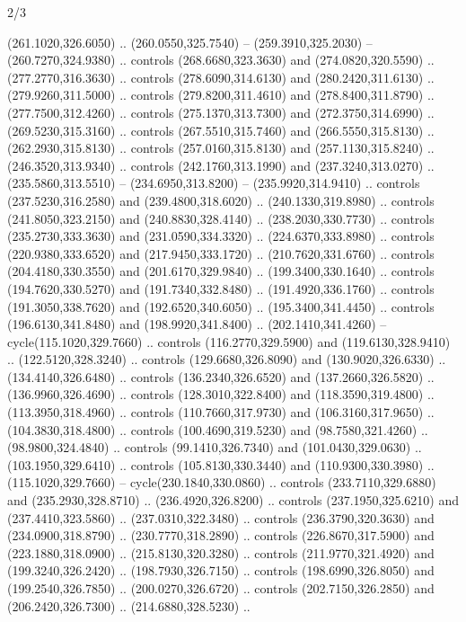 \begin{flagdescription}{2/3}
\begin{scope}[xshift=0.5\flaglength,yshift=0.5\flagwidth,scale=\stretchfactor]
\begin{scope}[scale=0.001645\flagwidth,yshift=65mm,xshift=-63mm]
\begin{scope}[y=0.80pt, x=0.80pt, yscale=-1,]
\begin{scope}[cm={{1.33333,0.0,0.0,1.33333,(0.0,1e-05)}}]
  (261.1020,326.6050) .. (260.0550,325.7540) -- (259.3910,325.2030) --
  (260.7270,324.9380) .. controls (268.6680,323.3630) and (274.0820,320.5590) ..
  (277.2770,316.3630) .. controls (278.6090,314.6130) and (280.2420,311.6130) ..
  (279.9260,311.5000) .. controls (279.8200,311.4610) and (278.8400,311.8790) ..
  (277.7500,312.4260) .. controls (275.1370,313.7300) and (272.3750,314.6990) ..
  (269.5230,315.3160) .. controls (267.5510,315.7460) and (266.5550,315.8130) ..
  (262.2930,315.8130) .. controls (257.0160,315.8130) and (257.1130,315.8240) ..
  (246.3520,313.9340) .. controls (242.1760,313.1990) and (237.3240,313.0270) ..
  (235.5860,313.5510) -- (234.6950,313.8200) -- (235.9920,314.9410) .. controls
  (237.5230,316.2580) and (239.4800,318.6020) .. (240.1330,319.8980) .. controls
  (241.8050,323.2150) and (240.8830,328.4140) .. (238.2030,330.7730) .. controls
  (235.2730,333.3630) and (231.0590,334.3320) .. (224.6370,333.8980) .. controls
  (220.9380,333.6520) and (217.9450,333.1720) .. (210.7620,331.6760) .. controls
  (204.4180,330.3550) and (201.6170,329.9840) .. (199.3400,330.1640) .. controls
  (194.7620,330.5270) and (191.7340,332.8480) .. (191.4920,336.1760) .. controls
  (191.3050,338.7620) and (192.6520,340.6050) .. (195.3400,341.4450) .. controls
  (196.6130,341.8480) and (198.9920,341.8400) .. (202.1410,341.4260) --
  cycle(115.1020,329.7660) .. controls (116.2770,329.5900) and
  (119.6130,328.9410) .. (122.5120,328.3240) .. controls (129.6680,326.8090) and
  (130.9020,326.6330) .. (134.4140,326.6480) .. controls (136.2340,326.6520) and
  (137.2660,326.5820) .. (136.9960,326.4690) .. controls (128.3010,322.8400) and
  (118.3590,319.4800) .. (113.3950,318.4960) .. controls (110.7660,317.9730) and
  (106.3160,317.9650) .. (104.3830,318.4800) .. controls (100.4690,319.5230) and
  (98.7580,321.4260) .. (98.9800,324.4840) .. controls (99.1410,326.7340) and
  (101.0430,329.0630) .. (103.1950,329.6410) .. controls (105.8130,330.3440) and
  (110.9300,330.3980) .. (115.1020,329.7660) -- cycle(230.1840,330.0860) ..
  controls (233.7110,329.6880) and (235.2930,328.8710) .. (236.4920,326.8200) ..
  controls (237.1950,325.6210) and (237.4410,323.5860) .. (237.0310,322.3480) ..
  controls (236.3790,320.3630) and (234.0900,318.8790) .. (230.7770,318.2890) ..
  controls (226.8670,317.5900) and (223.1880,318.0900) .. (215.8130,320.3280) ..
  controls (211.9770,321.4920) and (199.3240,326.2420) .. (198.7930,326.7150) ..
  controls (198.6990,326.8050) and (199.2540,326.7850) .. (200.0270,326.6720) ..
  controls (202.7150,326.2850) and (206.2420,326.7300) .. (214.6880,328.5230) ..

\end{scope}
\end{scope}
\end{scope}
\end{scope}
\end{flagdescription}
